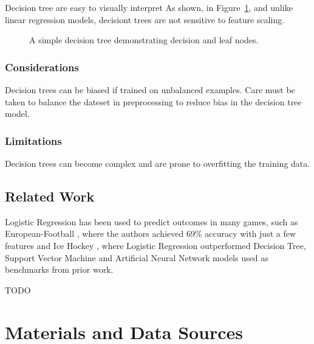 \documentclass[12pt]{article}
\begin{document}
Decision tree are easy to visually interpret As shown, in Figure~\ref{fig:decision-tree}, and unlike linear regression models, decisiont trees are not sensitive to feature scaling.

\begin{figure}[ht]
\centering
{}
\caption{A simple decision tree demonstrating decision and leaf nodes.}
\label{fig:decision-tree}
\end{figure}

\subsubsection{Considerations}Decision trees can be biased if trained on unbalanced examples. Care must be taken to balance the dateset in preprocessing to reduce bias in the decision tree model.

\subsubsection{Limitations}Decision trees can become complex and are prone to overfitting the training data.

\subsection{Related Work}

Logistic Regression has been used to predict outcomes in many games, such as European-Football \cite{Prasetio2016}, where the authors achieved 69\% accuracy with just a few features and Ice Hockey \cite{Chin2023}, where Logistic Regression outperformed Decision Tree, Support Vector Machine and Artificial Neural Network models used as benchmarks from prior work.

TODO

\section{Materials and Data Sources}
\end{document}
